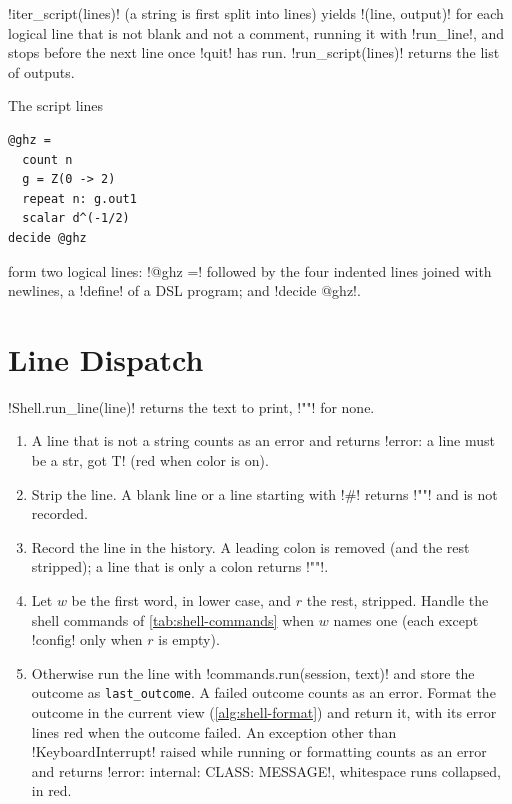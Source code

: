 \py!iter_script(lines)! (a string is first split into lines) yields \py!(line, output)! for each logical line that is not blank and not a comment, running it with \py!run_line!, and stops before the next line once \azx!quit! has run. \py!run_script(lines)! returns the list of outputs.

\begin{example}
The script lines
\begin{lstlisting}[style=azx]
@ghz =
  count n
  g = Z(0 -> 2)
  repeat n: g.out1
  scalar d^(-1/2)
decide @ghz
\end{lstlisting}
form two logical lines: \code!@ghz =! followed by the four indented lines joined with newlines, a \azx!define! of a DSL program; and \azx!decide @ghz!.
\end{example}

\section{Line Dispatch}\label{sec:shell-dispatch}

\begin{algorithm}\label{alg:shell-run-line}
\leavevmode
\py!Shell.run_line(line)! returns the text to print, \code!""! for none.
\begin{enumerate}
\item A line that is not a string counts as an error and returns \code!error: a line must be a str, got T! (red when color is on).
\item Strip the line. A blank line or a line starting with \code!#! returns \code!""! and is not recorded.
\item Record the line in the history. A leading colon is removed (and the rest stripped); a line that is only a colon returns \code!""!.
\item Let $w$ be the first word, in lower case, and $r$ the rest, stripped. Handle the shell commands of \cref{tab:shell-commands} when $w$ names one (each except \azx!config! only when $r$ is empty).
\item Otherwise run the line with \py!commands.run(session, text)! and store the outcome as \texttt{last\_outcome}. A failed outcome counts as an error. Format the outcome in the current view (\cref{alg:shell-format}) and return it, with its error lines red when the outcome failed. An exception other than \py!KeyboardInterrupt! raised while running or formatting counts as an error and returns \code!error: internal: CLASS: MESSAGE!, whitespace runs collapsed, in red.
\end{enumerate}
\end{algorithm}

